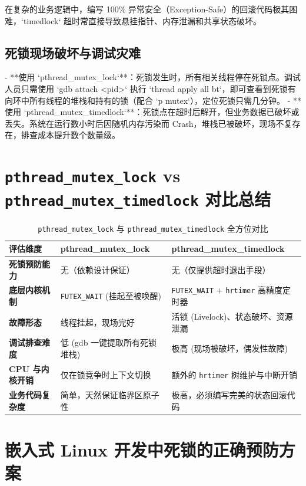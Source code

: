 \documentclass[12pt,a4paper]{article}
\begin{document}
在复杂的业务逻辑中，编写 100\% 异常安全（Exception-Safe）的回滚代码极其困难，`timedlock` 超时常直接导致悬挂指针、内存泄漏和共享状态破坏。

\subsection{死锁现场破坏与调试灾难}
- **使用 `pthread\_mutex\_lock`**：死锁发生时，所有相关线程停在死锁点。调试人员只需使用 `gdb attach <pid>` 执行 `thread apply all bt`，即可查看到死锁有向环中所有线程的堆栈和持有的锁（配合 `p mutex`），定位死锁只需几分钟。
- **使用 `pthread\_mutex\_timedlock`**：死锁点在超时后解开，但业务数据已破坏或丢失。系统在运行数小时后因随机内存污染而 Crash，堆栈已被破坏，现场不复存在，排查成本提升数个数量级。

\section{\texttt{pthread\_mutex\_lock} vs \texttt{pthread\_mutex\_timedlock} 对比总结}

\begin{table}[h]
\centering
\caption{\texttt{pthread\_mutex\_lock} 与 \texttt{pthread\_mutex\_timedlock} 全方位对比}
\vspace{2mm}
\begin{tabular}{p{3.5cm}p{5.5cm}p{5.5cm}}
\toprule
\textbf{评估维度} & \textbf{pthread\_mutex\_lock} & \textbf{pthread\_mutex\_timedlock} \\
\midrule
\textbf{死锁预防能力} & 无（依赖设计保证） & 无（仅提供超时退出手段） \\
\textbf{底层内核机制} & \texttt{FUTEX\_WAIT} (挂起至被唤醒) & \texttt{FUTEX\_WAIT} + \texttt{hrtimer} 高精度定时器 \\
\textbf{故障形态} & 线程挂起，现场完好 & 活锁 (Livelock)、状态破坏、资源泄漏 \\
\textbf{调试排查难度} & 低 (gdb 一键提取所有死锁堆栈) & 极高 (现场被破坏，偶发性故障) \\
\textbf{CPU 与内核开销} & 仅在锁竞争时上下文切换 & 额外的 \texttt{hrtimer} 树维护与中断开销 \\
\textbf{业务代码复杂度} & 简单，天然保证临界区原子性 & 极高，必须编写完美的状态回滚代码 \\
\bottomrule
\end{tabular}
\end{table}

\section{嵌入式 Linux 开发中死锁的正确预防方案}
\end{document}
